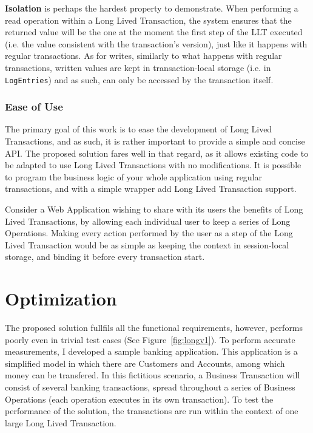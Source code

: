 \documentclass{llncs}
\begin{document}
{\bf Isolation} is perhaps the hardest property to demonstrate. When
performing a read operation within a Long Lived Transaction, the
system ensures that the returned value will be the one at the moment
the first step of the LLT executed (i.e. the value consistent with the
transaction's version), just like it happens with regular
transactions.  As for writes, similarly to what happens with regular
transactions, written values are kept in transaction-local storage
(i.e. in \texttt{LogEntries}) and as such, can only be accessed by the
transaction itself.

\subsubsection{Ease of Use}

The primary goal of this work is to ease the development of Long Lived
Transactions, and as such, it is rather important to provide a simple
and concise API. The proposed solution fares well in that regard, as
it allows existing code to be adapted to use Long Lived Transactions
with no modifications. It is possible to program the business logic of
your whole application using regular transactions, and with a simple
wrapper add Long Lived Transaction support.

Consider a Web Application wishing to share with its users the
benefits of Long Lived Transactions, by allowing each individual user
to keep a series of Long Operations. Making every action performed by
the user as a step of the Long Lived Transaction would be as simple as
keeping the context in session-local storage, and binding it before
every transaction start.



\section{Optimization}

The proposed solution fullfils all the functional requirements,
however, performs poorly even in trivial test cases (See
Figure~\ref{fig:longv1}). To perform accurate measurements, I
developed a sample banking application. This application is a
simplified model in which there are Customers and Accounts, among
which money can be transfered. In this fictitious scenario, a Business
Transaction will consist of several banking transactions, spread
throughout a series of Business Operations (each operation executes in
its own transaction). To test the performance of the solution, the
transactions are run within the context of one large Long Lived
Transaction.
\end{document}
